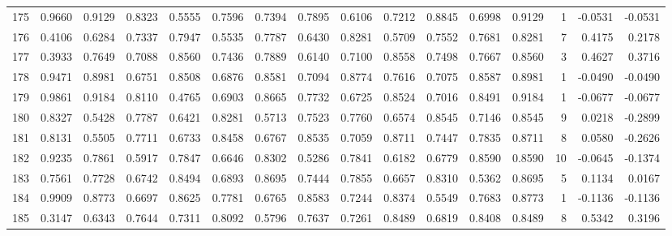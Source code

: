\begin{tabular}{lrrrrrrrrrrrrrrr}
175 &      0.9660 &  0.9129 &  0.8323 &  0.5555 &  0.7596 &  0.7394 &  0.7895 &  0.6106 &  0.7212 &  0.8845 &   0.6998 &     0.9129 &      1 &                   -0.0531 &                    -0.0531 \\
176 &      0.4106 &  0.6284 &  0.7337 &  0.7947 &  0.5535 &  0.7787 &  0.6430 &  0.8281 &  0.5709 &  0.7552 &   0.7681 &     0.8281 &      7 &                    0.4175 &                     0.2178 \\
177 &      0.3933 &  0.7649 &  0.7088 &  0.8560 &  0.7436 &  0.7889 &  0.6140 &  0.7100 &  0.8558 &  0.7498 &   0.7667 &     0.8560 &      3 &                    0.4627 &                     0.3716 \\
178 &      0.9471 &  0.8981 &  0.6751 &  0.8508 &  0.6876 &  0.8581 &  0.7094 &  0.8774 &  0.7616 &  0.7075 &   0.8587 &     0.8981 &      1 &                   -0.0490 &                    -0.0490 \\
179 &      0.9861 &  0.9184 &  0.8110 &  0.4765 &  0.6903 &  0.8665 &  0.7732 &  0.6725 &  0.8524 &  0.7016 &   0.8491 &     0.9184 &      1 &                   -0.0677 &                    -0.0677 \\
180 &      0.8327 &  0.5428 &  0.7787 &  0.6421 &  0.8281 &  0.5713 &  0.7523 &  0.7760 &  0.6574 &  0.8545 &   0.7146 &     0.8545 &      9 &                    0.0218 &                    -0.2899 \\
181 &      0.8131 &  0.5505 &  0.7711 &  0.6733 &  0.8458 &  0.6767 &  0.8535 &  0.7059 &  0.8711 &  0.7447 &   0.7835 &     0.8711 &      8 &                    0.0580 &                    -0.2626 \\
182 &      0.9235 &  0.7861 &  0.5917 &  0.7847 &  0.6646 &  0.8302 &  0.5286 &  0.7841 &  0.6182 &  0.6779 &   0.8590 &     0.8590 &     10 &                   -0.0645 &                    -0.1374 \\
183 &      0.7561 &  0.7728 &  0.6742 &  0.8494 &  0.6893 &  0.8695 &  0.7444 &  0.7855 &  0.6657 &  0.8310 &   0.5362 &     0.8695 &      5 &                    0.1134 &                     0.0167 \\
184 &      0.9909 &  0.8773 &  0.6697 &  0.8625 &  0.7781 &  0.6765 &  0.8583 &  0.7244 &  0.8374 &  0.5549 &   0.7683 &     0.8773 &      1 &                   -0.1136 &                    -0.1136 \\
185 &      0.3147 &  0.6343 &  0.7644 &  0.7311 &  0.8092 &  0.5796 &  0.7637 &  0.7261 &  0.8489 &  0.6819 &   0.8408 &     0.8489 &      8 &                    0.5342 &                     0.3196 \\

\end{tabular}
